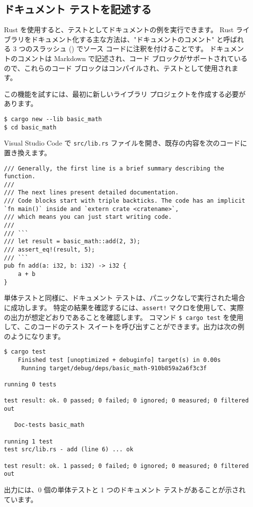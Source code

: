 \subsection{ドキュメント テストを記述する}

Rust を使用すると、テストとしてドキュメントの例を実行できます。 Rust ライブラリをドキュメント化する主な方法は、"ドキュメントのコメント" と呼ばれる 3 つのスラッシュ (\/\/\/) でソース コードに注釈を付けることです。 ドキュメントのコメントは Markdown で記述され、コード ブロックがサポートされているので、これらのコード ブロックはコンパイルされ、テストとして使用されます。

この機能を試すには、最初に新しいライブラリ プロジェクトを作成する必要があります。

\begin{lstlisting}[numbers=none]
$ cargo new --lib basic_math
$ cd basic_math
\end{lstlisting}


Visual Studio Code で \texttt{src/lib.rs} ファイルを開き、既存の内容を次のコードに置き換えます。


\begin{lstlisting}[numbers=none]
/// Generally, the first line is a brief summary describing the function.
///
/// The next lines present detailed documentation. 
/// Code blocks start with triple backticks. The code has an implicit `fn main()` inside and `extern crate <cratename>`,  
/// which means you can just start writing code.
///
/// ```
/// let result = basic_math::add(2, 3);
/// assert_eq!(result, 5);
/// ```
pub fn add(a: i32, b: i32) -> i32 {
    a + b
}
\end{lstlisting}

単体テストと同様に、ドキュメント テストは、パニックなしで実行された場合に成功します。 特定の結果を確認するには、\texttt{assert!} マクロを使用して、実際の出力が想定どおりであることを確認します。 コマンド \texttt{\$ cargo test} を使用して、このコードのテスト スイートを呼び出すことができます。出力は次の例のようになります。

\begin{lstlisting}[numbers=none]
$ cargo test
    Finished test [unoptimized + debuginfo] target(s) in 0.00s
     Running target/debug/deps/basic_math-910b859a2a6f3c3f

running 0 tests

test result: ok. 0 passed; 0 failed; 0 ignored; 0 measured; 0 filtered out

   Doc-tests basic_math

running 1 test
test src/lib.rs - add (line 6) ... ok

test result: ok. 1 passed; 0 failed; 0 ignored; 0 measured; 0 filtered out
\end{lstlisting}

出力には、0 個の単体テストと 1 つのドキュメント テストがあることが示されています。
